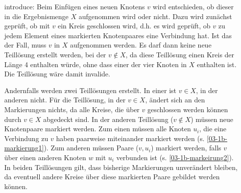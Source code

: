 \begin{itemize}
\item[introduce: ]Beim Einfügen eines neuen Knotens $v$ wird entschieden, ob dieser in die Ergebnismenge $X$ aufgenommen wird oder nicht. Dazu wird zunächst geprüft, ob mit $v$ ein Kreis geschlossen wird, d.h. es wird geprüft, ob $v$ zu jedem Element eines markierten Knotenpaares eine Verbindung hat. Ist das der Fall, muss $v$ in $X$ aufgenommen werden. Es darf dann keine neue Teillösung erstellt werden, bei der $v\notin X$, da diese Teillösung einen Kreis der Länge 4 enthalten würde, ohne dass einer der vier Knoten in $X$ enthalten ist. Die Teillösung wäre damit invalide.

Andernfalls werden zwei Teillösungen erstellt. In einer ist $v\in X$, in der anderen nicht. Für die Teillösung, in der $v\in X$, ändert sich an den Markierungen nichts, da alle Kreise, die über $v$ geschlossen werden können durch $v\in X$ abgedeckt sind. In der anderen Teillösung ($v\notin X$) müssen neue Knotenpaare markiert werden. Zum einen müssen alle Knoten $u_i$, die eine Verbindung zu $v$ haben paarweise miteinander markiert werden (s. \autoref{03-1b-markierung1}). Zum anderen müssen Paare ($v,u_i$) markiert werden, falls $v$ über einen anderen Knoten $w$ mit $u_i$ verbunden ist (s. \autoref{03-1b-markeirung2}). In beiden Teillösungen gilt, dass bisherige Markierungen unverändert bleiben, da eventuell andere Kreise über diese markierten Paare gebildet werden können.


\end{itemize}
